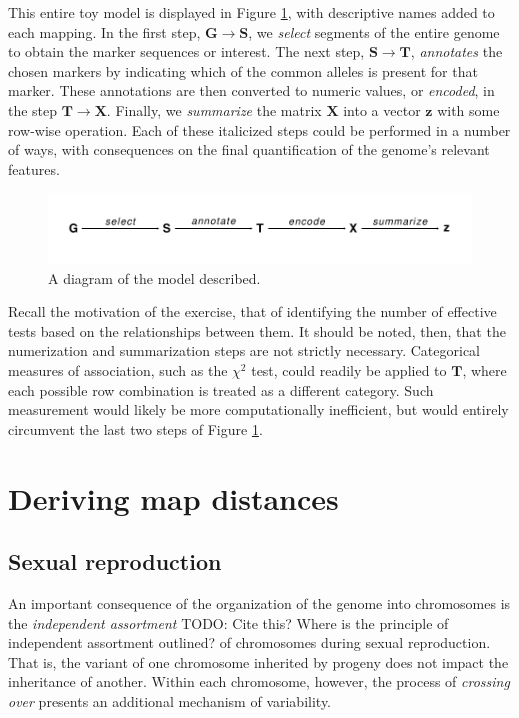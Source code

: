 \documentclass{article}
\newcommand{\ve}[1]{\mathbf{#1}}           %
\newcommand{\m}[1]{\mathbf{#1}}               %
\newcommand{\TODO}[1]{{\color{brickred} TODO:  {#1}}}
\begin{document}
This entire toy model is displayed in Figure \ref{fig:modelDiagram}, with descriptive names added to each mapping. In the first step, $\m{G} \rightarrow \m{S}$, we \textit{select} segments of the entire genome to obtain the marker sequences or interest. The next step, $\m{S} \rightarrow \m{T}$, \textit{annotates} the chosen markers by indicating which of the common alleles is present for that marker. These annotations are then converted to numeric values, or \textit{encoded}, in the step $\m{T} \rightarrow \m{X}$. Finally, we \textit{summarize} the matrix $\m{X}$ into a vector $\ve{z}$ with some row-wise operation. Each of these italicized steps could be performed in a number of ways, with consequences on the final quantification of the genome's relevant features.

\begin{figure}[!ht]
  \begin{center}
  \includegraphics[scale = 1]{./img/modelDiagram.pdf}
  \caption{A diagram of the model described.}
  \label{fig:modelDiagram}
\end{center}
\end{figure}

Recall the motivation of the exercise, that of identifying the number of effective tests based on the relationships between them. It should be noted, then, that the numerization and summarization steps are not strictly necessary. Categorical measures of association, such as the $\chi^2$ test, could readily be applied to $\m{T}$, where each possible row combination is treated as a different category. Such measurement would likely be more computationally inefficient, but would entirely circumvent the last two steps of Figure \ref{fig:modelDiagram}. 

\section{Deriving map distances} \label{sec:derivingDists}

\subsection{Sexual reproduction} \label{subsec:crossingover}

An important consequence of the organization of the genome into chromosomes is the \textit{independent assortment} \TODO{Cite this? Where is the principle of independent assortment outlined?} of chromosomes during sexual reproduction. That is, the variant of one chromosome inherited by progeny does not impact the inheritance of another. Within each chromosome, however, the process of \textit{crossing over} presents an additional mechanism of variability.
\end{document}
